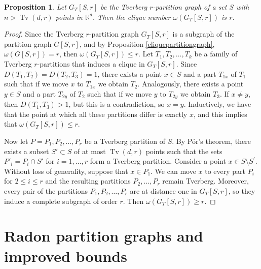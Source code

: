 \documentclass[11pt,a4paper]{article}
\theoremstyle{plain}
\newtheorem{proposition}{Proposition}
\theoremstyle{definition}
\newcommand{\rr}{\mathds{R}}
\newcommand{\tv}{\operatorname{Tv}}
\begin{document}
\begin{proposition}
Let $G_T[S,r]$ be the Tverberg $r$-partition graph of a set $S$ with $n>\tv(d,r)$ points in $\rr^d$.  Then the clique number $\omega(G_T[S,r])$ is $r$.
\end{proposition}


\begin{proof}
Since the Tverberg $r$-partition graph $G_T[S,r]$ is a subgraph of the partition graph $G[S,r]$, and by Proposition \ref{cliquepartitiongraph}, $\omega(G[S,r])=r$, then $\omega(G_T[S,r])\leq r$.
 Let $T_1,T_2,\dots,T_k$ be a family of Tverberg $r$-partitions that induces a clique in $G_T[S,r]$. Since $D(T_1,T_2)=D(T_2,T_3)=1$, there exists a point $x\in S$ and a part $T_{1x}$ of $T_1$ such that if we move $x$ to $T_{1x}$ we obtain $T_2$. Analogously, there exists a point $y\in S$ and a part $T_{2y}$ of $T_2$ such that if we move $y$ to $T_{2y}$ we obtain $T_3$.
 If $x\neq y$, then $D(T_1,T_3)>1$, but this is a contradiction, so $x=y$. Inductively, we have that the point at which all these partitions differ is exactly $x$, and this implies that $\omega(G_T[S,r])\leq r$. 

Now let $P=P_{1}, P_{2}, \dots, P_{r}$ be a Tverberg partition of $S$. By P\'or's theorem, there exists a subset $S' \subset S$ of at most $\tv(d,r)$ points such that the sets $P'_{i} = P_{i} \cap S'$ for $i=1,\dots, r$ form a Tverberg partition. Consider a point $x\in S\setminus S^\prime$. Without loss of generality, suppose that $x\in P_{1}$. We can move $x$ to every part $P_{i}$ for $2\leq i \leq r$ and the resulting partitions $P_2,\dots ,P_r$ remain Tverberg. Moreover, every pair of the partitions $P_1,P_2,\dots,P_r$ are at distance one in $G_T[S,r]$, so they induce a complete subgraph of order $r$. 
Then $\omega(G_T[S,r])\geq r$.
\end{proof}



\section{Radon partition graphs and improved bounds}\label{radon and bounds}

\end{document}
